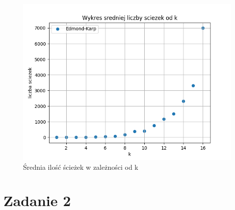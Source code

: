 \documentclass{report}
\begin{document}
\begin{figure}[H]
    \centering
    \includegraphics[scale=0.55]{../ex1_and_4/plots/karp_paths.png}
    \caption{Średnia ilość ścieżek w zależności od k}
\end{figure}

\section*{Zadanie 2}
\end{document}
